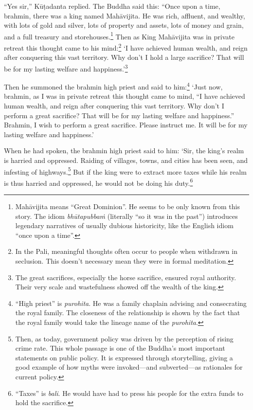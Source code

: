 \documentclass[12pt,openany]{book}%
\begin{document}
“Yes sir,” \textsanskrit{Kūṭadanta} replied. The Buddha said this: “Once upon a time, brahmin, there was a king named \textsanskrit{Mahāvijita}. He was rich, affluent, and wealthy, with lots of gold and silver, lots of property and assets, lots of money and grain, and a full treasury and storehouses.\footnote{\textsanskrit{Mahāvijita} means “Great Dominion”. He seems to be only known from this story. The idiom \textit{\textsanskrit{bhūtapubbaṁ}} (literally “so it was in the past”) introduces legendary narratives of usually dubious historicity, like the English idiom “once upon a time”. } Then as King \textsanskrit{Mahāvijita} was in private retreat this thought came to his mind:\footnote{In the Pali, meaningful thoughts often occur to people when withdrawn in seclusion. This doesn’t necessary mean they were in formal meditation. } ‘I have achieved human wealth, and reign after conquering this vast territory. Why don’t I hold a large sacrifice? That will be for my lasting welfare and happiness.’\footnote{The great sacrifices, especially the horse sacrifice, ensured royal authority. Their very scale and wastefulness showed off the wealth of the king. } 

Then he summoned the brahmin high priest and said to him:\footnote{“High priest” is \textit{purohita}. He was a family chaplain advising and consecrating the royal family. The closeness of the relationship is shown by the fact that the royal family would take the lineage name of the \textit{purohita}. } ‘Just now, brahmin, as I was in private retreat this thought came to mind, “I have achieved human wealth, and reign after conquering this vast territory. Why don’t I perform a great sacrifice? That will be for my lasting welfare and happiness.” Brahmin, I wish to perform a great sacrifice. Please instruct me. It will be for my lasting welfare and happiness.’ 

When he had spoken, the brahmin high priest said to him: ‘Sir, the king’s realm is harried and oppressed. Raiding of villages, towns, and cities has been seen, and infesting of highways.\footnote{Then, as today, government policy was driven by the perception of rising crime rate. This whole passage is one of the Buddha’s most important statements on public policy. It is expressed through storytelling, giving a good example of how myths were invoked—and subverted—as rationales for current policy. } But if the king were to extract more taxes while his realm is thus harried and oppressed, he would not be doing his duty.\footnote{“Taxes” is \textit{bali}. He would have had to press his people for the extra funds to hold the sacrifice. } 
\end{document}
